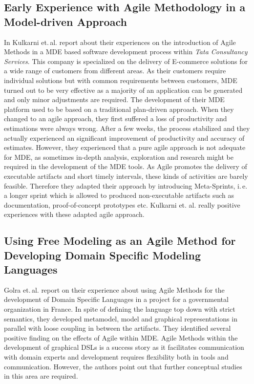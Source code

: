 \documentclass[10pt, a4paper, twocolumn]{article}
\begin{document}
\subsection{Early Experience with Agile Methodology in a Model-driven Approach}

In \cite{11} Kulkarni et.\,al. report about their experiences on the introduction of Agile Methods in a MDE based software development process within \emph{Tata Consultancy Services}.
This company is specialized on the delivery of E-commerce solutions for a wide range of customers from different areas.
As their customers require individual solutions but with common requirements between customers, MDE turned out to be very effective as a majority of an application can be generated and only minor adjustments are required.
The development of their MDE platform used to be based on a traditional plan-driven approach. 
When they changed to an agile approach, they first suffered a loss of productivity and estimations were always wrong. 
After a few weeks, the process stabilized and they actually experienced an significant improvement of productivity and accuracy of estimates.
However, they experienced that a pure agile approach is not adequate for MDE, as sometimes in-depth analysis, exploration and research might be required in the development of the MDE tools.
As Agile promotes the delivery of executable artifacts and short timely intervals, these kinds of activities are barely feasible.
Therefore they adapted their approach by introducing Meta-Sprints, i.\,e. a longer sprint which is allowed to produced non-executable artifacts such as documentation, proof-of-concept prototypes etc.
Kulkarni et. al. really positive experiences with these adapted agile approach.

\subsection{Using Free Modeling as an Agile Method for Developing Domain Specific Modeling Languages}

Golra et.\,al. \cite{12} report on their experience about using Agile Methods for the development of Domain Specific Languages in a project for a governmental organization in France.
In spite of defining the language top down with strict semantics, they developed metamodel, model and graphical representations in parallel with loose coupling in between the artifacts.
They identified several positive finding on the effects of Agile within MDE.
Agile Methods within the development of graphical DSLs is a success story as it facilitates communication with domain experts and development requires flexibility both in tools and communication.
However, the authors point out that further conceptual studies in this area are required.
\end{document}
